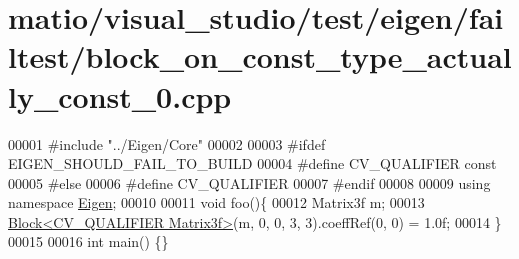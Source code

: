 \hypertarget{matio_2visual__studio_2test_2eigen_2failtest_2block__on__const__type__actually__const__0_8cpp_source}{}\section{matio/visual\+\_\+studio/test/eigen/failtest/block\+\_\+on\+\_\+const\+\_\+type\+\_\+actually\+\_\+const\+\_\+0.cpp}
\label{matio_2visual__studio_2test_2eigen_2failtest_2block__on__const__type__actually__const__0_8cpp_source}

\begin{DoxyCode}
00001 \textcolor{preprocessor}{#include "../Eigen/Core"}
00002 
00003 \textcolor{preprocessor}{#ifdef EIGEN\_SHOULD\_FAIL\_TO\_BUILD}
00004 \textcolor{preprocessor}{#define CV\_QUALIFIER const}
00005 \textcolor{preprocessor}{#else}
00006 \textcolor{preprocessor}{#define CV\_QUALIFIER}
00007 \textcolor{preprocessor}{#endif}
00008 
00009 \textcolor{keyword}{using namespace }\hyperlink{namespace_eigen}{Eigen};
00010 
00011 \textcolor{keywordtype}{void} foo()\{
00012     Matrix3f m;
00013     \hyperlink{group___core___module_class_eigen_1_1_block}{Block<CV\_QUALIFIER Matrix3f>}(m, 0, 0, 3, 3).coeffRef(0, 0) = 1.0f;
00014 \}
00015 
00016 \textcolor{keywordtype}{int} main() \{\}
\end{DoxyCode}
